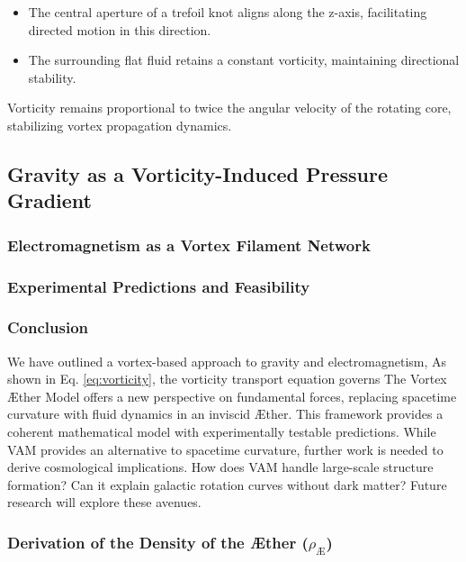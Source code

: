 \begin{itemize}
    \item The central aperture of a trefoil knot aligns along the z-axis, facilitating directed motion in this direction.
    \item The surrounding flat fluid retains a constant vorticity, maintaining directional stability.
\end{itemize}
Vorticity remains proportional to twice the angular velocity of the rotating core, stabilizing vortex propagation dynamics.


\subsection{Gravity as a Vorticity-Induced Pressure Gradient}\label{sec:gravity-as-a-vorticity-induced-pressure-gradient}
    \subsubsection{Electromagnetism as a Vortex Filament Network}\label{sec:electromagnetism-as-a-vortex-filament-network}
    \subsubsection{Experimental Predictions and Feasibility}\label{sec:experimental-predictions-and-feasibility}
    \subsubsection{Conclusion}\label{sec:conclusion}
    We have outlined a vortex-based approach to gravity and electromagnetism, As shown in Eq. \eqref{eq:vorticity}, the vorticity transport equation governs  The Vortex \AE ther Model offers a new perspective on fundamental forces,
    replacing spacetime curvature with fluid dynamics in an inviscid \AE ther.
    This framework provides a coherent mathematical model with experimentally testable predictions.
    While VAM provides an alternative to spacetime curvature, further work is needed to derive cosmological implications.
    How does VAM handle large-scale structure formation?
    Can it explain galactic rotation curves without dark matter?
    Future research will explore these avenues.









        \subsubsection{Derivation of the Density of the \AE ther ($\rho_\text{\AE}$)}\label{sec:derivation-of-the-density-of-the-ae{}ther-($rho_text{ae}$)}

